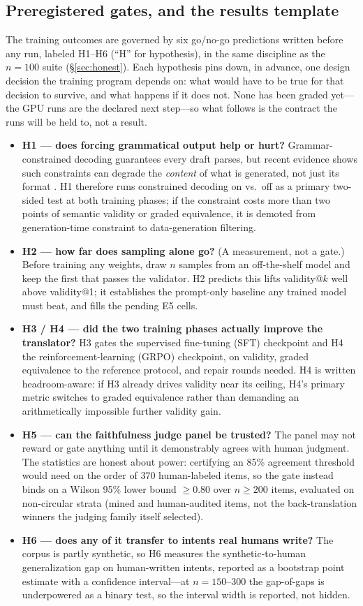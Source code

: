 \documentclass{article}
\begin{document}
\subsection{Preregistered gates, and the results template}\label{sec:seam-gates}
The training outcomes are governed by six go/no-go predictions written before any run, labeled H1--H6 (``H'' for hypothesis), in the same discipline as the $n{=}100$ suite (\S\ref{sec:honest}). Each hypothesis pins down, in advance, one design decision the training program depends on: what would have to be true for that decision to survive, and what happens if it does not. None has been graded yet---the GPU runs are the declared next step---so what follows is the contract the runs will be held to, not a result.
\begin{itemize}\itemsep2pt
\item \textbf{H1 --- does forcing grammatical output help or hurt?} Grammar-constrained decoding guarantees every draft parses, but recent evidence shows such constraints can degrade the \emph{content} of what is generated, not just its format \citep{formattax26}. H1 therefore runs constrained decoding on vs.\ off as a primary two-sided test at both training phases; if the constraint costs more than two points of semantic validity or graded equivalence, it is demoted from generation-time constraint to data-generation filtering.
\item \textbf{H2 --- how far does sampling alone go?} (A measurement, not a gate.) Before training any weights, draw $n$ samples from an off-the-shelf model and keep the first that passes the validator. H2 predicts this lifts validity@$k$ well above validity@1; it establishes the prompt-only baseline any trained model must beat, and fills the pending E5 cells.
\item \textbf{H3 / H4 --- did the two training phases actually improve the translator?} H3 gates the supervised fine-tuning (SFT) checkpoint and H4 the reinforcement-learning (GRPO) checkpoint, on validity, graded equivalence to the reference protocol, and repair rounds needed. H4 is written headroom-aware: if H3 already drives validity near its ceiling, H4's primary metric switches to graded equivalence rather than demanding an arithmetically impossible further validity gain.
\item \textbf{H5 --- can the faithfulness judge panel be trusted?} The panel may not reward or gate anything until it demonstrably agrees with human judgment. The statistics are honest about power: certifying an 85\% agreement threshold would need on the order of 370 human-labeled items, so the gate instead binds on a Wilson 95\% lower bound $\geq 0.80$ over $n \geq 200$ items, evaluated on non-circular strata (mined and human-audited items, not the back-translation winners the judging family itself selected).
\item \textbf{H6 --- does any of it transfer to intents real humans write?} The corpus is partly synthetic, so H6 measures the synthetic-to-human generalization gap on human-written intents, reported as a bootstrap point estimate with a confidence interval---at $n{=}150$--$300$ the gap-of-gaps is underpowered as a binary test, so the interval width is reported, not hidden.
\end{itemize}
\end{document}
